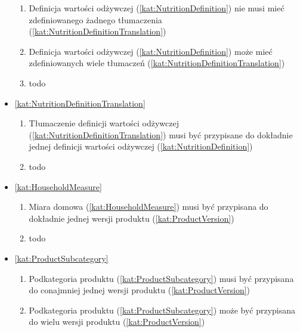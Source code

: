 \begin{itemize}[label={\textbf{Reguły dla}}, wide, labelwidth=!, labelindent=0pt]
    \begin{enumerate}[label={\textbf{REG/\protect\threedigits{\arabic{enumi}}}}, wide, labelwidth=!, align=left, leftmargin=3cm, resume]
        \item Definicja wartości odżywczej (\ref{kat:NutritionDefinition}) nie musi mieć zdefiniowanego żadnego tłumaczenia (\ref{kat:NutritionDefinitionTranslation})
        \item Definicja wartości odżywczej (\ref{kat:NutritionDefinition}) może mieć zdefiniowanych wiele tłumaczeń (\ref{kat:NutritionDefinitionTranslation})
        \item todo
    \end{enumerate}
    \item\ref{kat:NutritionDefinitionTranslation}
    \begin{enumerate}[label={\textbf{REG/\protect\threedigits{\arabic{enumi}}}}, wide, labelwidth=!, align=left, leftmargin=3cm, resume]
        \item Tłumaczenie definicji wartości odżywczej (\ref{kat:NutritionDefinitionTranslation}) musi być przypisane do dokładnie jednej definicji wartości odżywczej  (\ref{kat:NutritionDefinition})
        \item todo
    \end{enumerate}
    \item\ref{kat:HouseholdMeasure}
    \begin{enumerate}[label={\textbf{REG/\protect\threedigits{\arabic{enumi}}}}, wide, labelwidth=!, align=left, leftmargin=3cm, resume]
        \item Miara domowa (\ref{kat:HouseholdMeasure}) musi być przypisana do dokładnie jednej wersji produktu (\ref{kat:ProductVersion})
        \item todo
    \end{enumerate}
    \item\ref{kat:ProductSubcategory}
    \begin{enumerate}[label={\textbf{REG/\protect\threedigits{\arabic{enumi}}}}, wide, labelwidth=!, align=left, leftmargin=3cm, resume]
        \item Podkategoria produktu (\ref{kat:ProductSubcategory}) musi być przypisana do conajmniej jednej wersji produktu (\ref{kat:ProductVersion})
        \item Podkategoria produktu (\ref{kat:ProductSubcategory}) może być przypisana do wielu wersji produktu (\ref{kat:ProductVersion})

\end{enumerate}
\end{itemize}
